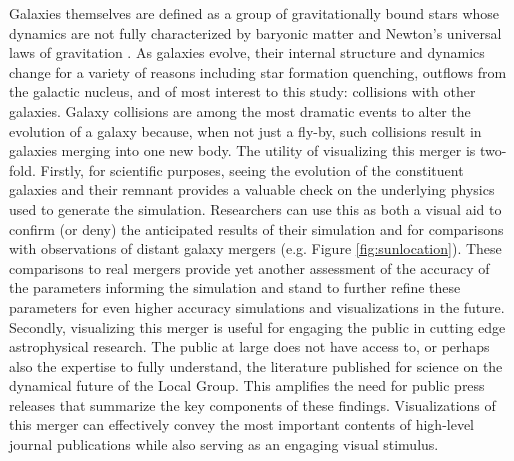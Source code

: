 \documentclass{aastex63}
\begin{document}
Galaxies themselves are defined as a group of gravitationally bound stars whose dynamics are not fully characterized by baryonic matter and Newton's universal laws of gravitation \citep{2012AJ....144...76W}. As galaxies evolve, their internal structure and dynamics change for a variety of reasons including star formation quenching, outflows from the galactic nucleus, and of most interest to this study: collisions with other galaxies. Galaxy collisions are among the most dramatic events to alter the evolution of a galaxy because, when not just a fly-by, such collisions result in galaxies merging into one new body. The utility of visualizing this merger is two-fold. Firstly, for scientific purposes, seeing the evolution of the constituent galaxies and their remnant provides a valuable check on the underlying physics used to generate the simulation. Researchers can use this as both a visual aid to confirm (or deny) the anticipated results of their simulation and for comparisons with observations of distant galaxy mergers (e.g. Figure \ref{fig:sunlocation}). These comparisons to real mergers provide yet another assessment of the accuracy of the parameters informing the simulation and stand to further refine these parameters for even higher accuracy simulations and visualizations in the future. Secondly, visualizing this merger is useful for engaging the public in cutting edge astrophysical research. The public at large does not have access to, or perhaps also the expertise to fully understand, the literature published for science on the dynamical future of the Local Group. This amplifies the need for public press releases that summarize the key components of these findings. Visualizations of this merger can effectively convey the most important contents of high-level journal publications while also serving as an engaging visual stimulus.
\end{document}
